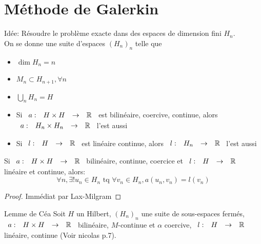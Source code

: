 \documentclass[]{report}
\begin{document}
    \section{Méthode de Galerkin}

    Idée: Résoudre le problème exacte dans des espaces de dimension fini $H_n$.\\
    On se donne une suite d'espaces $(H_n)_n$ telle que
    \begin{itemize}
        \item $\dim H_n=n$\\
        \item $M_n\subset H_{n+1},\forall n$
        \item $\bigcup_n H_n=H$
    \end{itemize}

    \begin{prop}{}{}
        \begin{itemize}
            \item Si $\begin{array}{ccccc} a : & H\times H & \to & \mathbb{R} \end{array}$ est bilinéaire, coercive, continue, alors $\begin{array}{ccccc} a : & H_n\times H_n & \to & \mathbb{R} \end{array}$ l'est aussi
            \item Si $\begin{array}{ccccc} l : & H & \to & \mathbb{R} \end{array}$ est linéaire continue, alors $\begin{array}{ccccc} l : & H_n & \to & \mathbb{R} \end{array}$ l'est aussi
        \end{itemize}
    \end{prop}

    \begin{cor}{}{}
        Si $\begin{array}{ccccc} a : & H\times H & \to & \mathbb{R} \end{array}$ bilinéaire, continue, coercice et $\begin{array}{ccccc} l : & H & \to & \mathbb{R} \end{array}$ linéaire et continue, alors:
        \[\forall n,\exists! u_n\in H_n\text{ tq }\forall v_n\in H_n,a(u_n,v_n)=l(v_n)\]
    \end{cor}

    \begin{proof}
        Immédiat par Lax-Milgram
    \end{proof}

    \begin{lm}{Lemme de Céa}{}
        Soit $H$ un Hilbert, $(H_n)_n$ une suite de sous-espaces fermés, $\begin{array}{ccccc} a : & H\times H & \to & \mathbb{R} \end{array}$ bilinéaire, $M$-continue et $\alpha$ coercive, $\begin{array}{ccccc} l : & H & \to & \mathbb{R} \end{array}$ linéaire, continue (Voir nicolas p.7).
    \end{lm}
\end{document}
